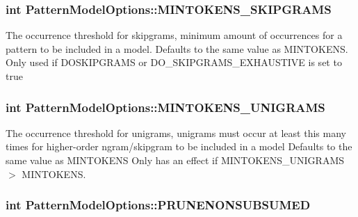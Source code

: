 \subsubsection[{M\+I\+N\+T\+O\+K\+E\+N\+S\+\_\+\+S\+K\+I\+P\+G\+R\+A\+M\+S}]{\setlength{\rightskip}{0pt plus 5cm}int Pattern\+Model\+Options\+::\+M\+I\+N\+T\+O\+K\+E\+N\+S\+\_\+\+S\+K\+I\+P\+G\+R\+A\+M\+S}\label{classPatternModelOptions_a130b2214a2a9eaaa4862f8019fdfe2bc}
The occurrence threshold for skipgrams, minimum amount of occurrences for a pattern to be included in a model. Defaults to the same value as M\+I\+N\+T\+O\+K\+E\+N\+S. Only used if D\+O\+S\+K\+I\+P\+G\+R\+A\+M\+S or D\+O\+\_\+\+S\+K\+I\+P\+G\+R\+A\+M\+S\+\_\+\+E\+X\+H\+A\+U\+S\+T\+I\+V\+E is set to true \hypertarget{classPatternModelOptions_a14d2ed1c3edb2c9b3944aff462e87a03}{}
\subsubsection[{M\+I\+N\+T\+O\+K\+E\+N\+S\+\_\+\+U\+N\+I\+G\+R\+A\+M\+S}]{\setlength{\rightskip}{0pt plus 5cm}int Pattern\+Model\+Options\+::\+M\+I\+N\+T\+O\+K\+E\+N\+S\+\_\+\+U\+N\+I\+G\+R\+A\+M\+S}\label{classPatternModelOptions_a14d2ed1c3edb2c9b3944aff462e87a03}
The occurrence threshold for unigrams, unigrams must occur at least this many times for higher-\/order ngram/skipgram to be included in a model Defaults to the same value as M\+I\+N\+T\+O\+K\+E\+N\+S Only has an effect if M\+I\+N\+T\+O\+K\+E\+N\+S\+\_\+\+U\+N\+I\+G\+R\+A\+M\+S $>$ M\+I\+N\+T\+O\+K\+E\+N\+S. \hypertarget{classPatternModelOptions_acb220b576d5b4126289cd4a6dec98a1c}{}
\subsubsection[{P\+R\+U\+N\+E\+N\+O\+N\+S\+U\+B\+S\+U\+M\+E\+D}]{\setlength{\rightskip}{0pt plus 5cm}int Pattern\+Model\+Options\+::\+P\+R\+U\+N\+E\+N\+O\+N\+S\+U\+B\+S\+U\+M\+E\+D}\label{classPatternModelOptions_acb220b576d5b4126289cd4a6dec98a1c}
\hypertarget{classPatternModelOptions_ad99d007239e6ef18a6fd8ce51fb9d1bd}{}
